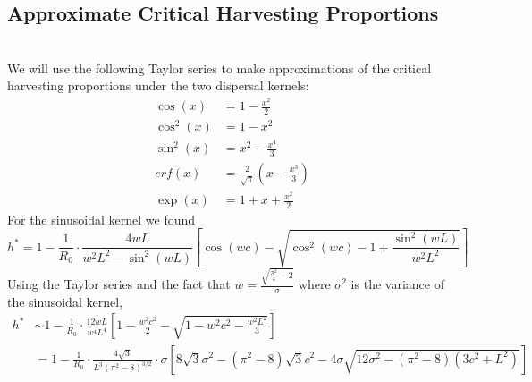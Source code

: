 \documentclass[12pt,english]{article}
\begin{document}
\subsection{Approximate Critical Harvesting Proportions}
~\\We will use the following Taylor series to make approximations of the critical harvesting proportions under the two dispersal kernels:
\begin{align*}
\cos(x)&=1-\frac{x^2}{2}
\\ \cos^2(x)&=1-x^2
\\ \sin^2(x)&=x^2-\frac{x^4}{3}
\\ erf(x)&=\frac{2}{\sqrt{\pi}}(x-\frac{x^3}{3})
\\ \exp(x)&=1+x+\frac{x^2}{2}
\end{align*}
For the sinusoidal kernel we found 
\begin{equation}
h^*=1-\frac{1}{R_0}\cdot\frac{4wL}{w^2L^2-\sin^2(wL)}\left[\cos(wc)-\sqrt{\cos^2(wc)-1+\frac{\sin^2(wL)}{w^2L^2}}\right] 
\end{equation} 
Using the Taylor series and the fact that $w=\frac{\sqrt{\frac{\pi^2}{4}-2}}{\sigma}$ where $\sigma^2$ is the variance of the sinusoidal kernel,
\begin{align*}
h^*&\sim 1-\frac{1}{R_0}\cdot\frac{12wL}{w^4L^4}\left[1-\frac{w^2c^2}{2}-\sqrt{1-w^2c^2-\frac{w^2L^2}{3}}\right]
\\&=1-\frac{1}{R_0}\cdot\frac{4\sqrt{3}}{L^3(\pi^2-8)^{3/2}}\cdot\sigma\left[8\sqrt{3}\sigma^2-(\pi^2-8)\sqrt{3}c^2-4\sigma\sqrt{12\sigma^2-(\pi^2-8)(3c^2+L^2)}\right]
\end{align*}
\end{document}

